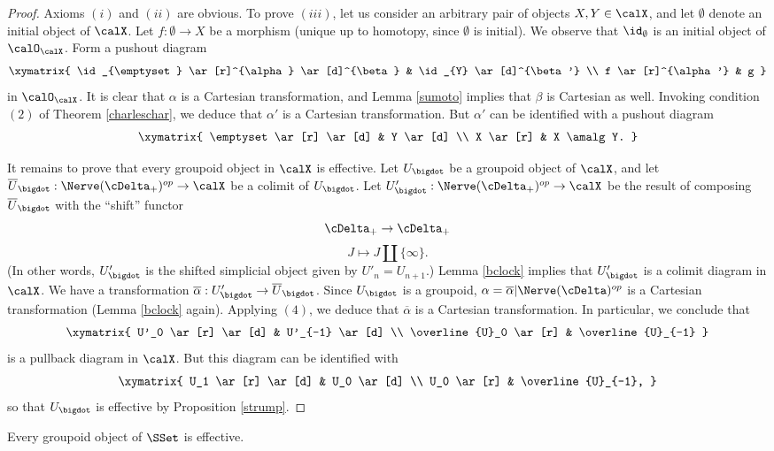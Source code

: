 \begin{proof}
Axioms $(i)$ and $(ii)$ are obvious. To prove $(iii)$, let us consider an arbitrary pair of objects
$X, Y \in \calX$, and let $\emptyset$ denote an initial object of $\calX$. Let $f: \emptyset \rightarrow X$ be a morphism (unique up to homotopy, since $\emptyset$ is initial). We observe that
$\id_{\emptyset}$ is an initial object of $\calO_{\calX}$. Form a pushout diagram
$$ \xymatrix{ \id_{\emptyset} \ar[r]^{\alpha} \ar[d]^{\beta} & \id_{Y} \ar[d]^{\beta'}  \\
f \ar[r]^{\alpha'} & g }$$
in $\calO_{\calX}$. It is clear that $\alpha$ is a Cartesian transformation, and Lemma \ref{sumoto} implies that $\beta$ is Cartesian as well. Invoking condition $(2)$ of Theorem \ref{charleschar}, we deduce that $\alpha'$ is
a Cartesian transformation. But $\alpha'$ can be identified with a pushout diagram
$$ \xymatrix{ \emptyset \ar[r] \ar[d] & Y \ar[d] \\
X \ar[r] & X \amalg Y. }$$

It remains to prove that every groupoid object in $\calX$ is effective. Let $U_{\bigdot}$
be a groupoid object of $\calX$, and let $\overline{U}_{\bigdot}  : \Nerve(\cDelta_{+})^{op} \rightarrow \calX$ be a colimit of $U_{\bigdot}$. Let $U'_{\bigdot}: \Nerve(\cDelta_{+})^{op} \rightarrow \calX$
be the result of composing $\overline{U}_{\bigdot}$ with the ``shift'' functor
$$ \cDelta_{+} \rightarrow \cDelta_{+}$$
$$ J \mapsto J \amalg \{ \infty \}.$$
(In other words, $U'_{\bigdot}$ is the shifted simplicial object given by
$U'_{n} = U_{n+1}$.)
Lemma \ref{bclock} implies that $U'_{\bigdot}$ is a colimit diagram in $\calX$.
We have a transformation $\overline{\alpha}: U'_{\bigdot} \rightarrow \overline{U}_{\bigdot}$.
Since $U_{\bigdot}$ is a groupoid, $\alpha = \overline{\alpha} | \Nerve(\cDelta)^{op}$
is a Cartesian transformation (Lemma \ref{bclock} again). Applying $(4)$, we deduce
that $\overline{\alpha}$ is a Cartesian transformation. In particular, we conclude that
$$ \xymatrix{ U'_0 \ar[r] \ar[d] & U'_{-1} \ar[d] \\
\overline{U}_0 \ar[r] & \overline{U}_{-1} }$$
is a pullback diagram in $\calX$. But this diagram can be identified with
$$ \xymatrix{ U_1 \ar[r] \ar[d] & U_0 \ar[d] \\
U_0 \ar[r] & \overline{U}_{-1}, }$$
so that $U_{\bigdot}$ is effective by Proposition \ref{strump}.
\end{proof}

\begin{corollary}\label{alleff}
Every groupoid object of $\SSet$ is effective.
\end{corollary}

